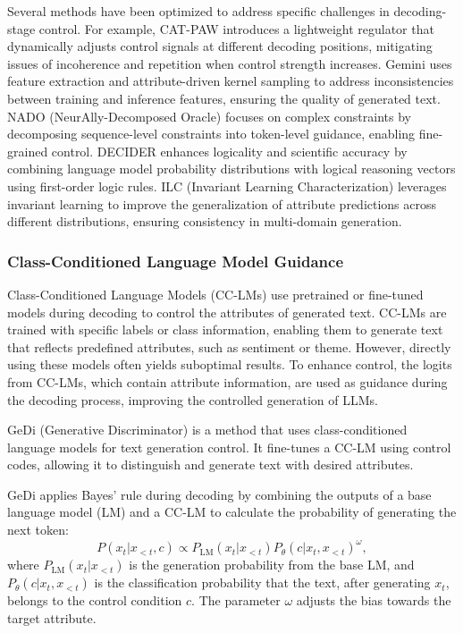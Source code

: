 \documentclass[acmsmall, screen]{acmart}
\begin{document}
Several methods have been optimized to address specific challenges in decoding-stage control. For example, CAT-PAW \cite{gu_acl22-CAT-PAW} introduces a lightweight regulator that dynamically adjusts control signals at different decoding positions, mitigating issues of incoherence and repetition when control strength increases.
Gemini \cite{liu_arxiv22_Gemini} uses feature extraction and attribute-driven kernel sampling to address inconsistencies between training and inference features, ensuring the quality of generated text.
NADO (NeurAlly-Decomposed Oracle) \cite{meng_NIPS22_NADO} focuses on complex constraints by decomposing sequence-level constraints into token-level guidance, enabling fine-grained control.
DECIDER \cite{xu_arxiv24_DECIDER} enhances logicality and scientific accuracy by combining language model probability distributions with logical reasoning vectors using first-order logic rules.
ILC (Invariant Learning Characterization) \cite{zheng_acl23_ILC} leverages invariant learning to improve the generalization of attribute predictions across different distributions, ensuring consistency in multi-domain generation.

\subsubsection{\textbf{Class-Conditioned Language Model Guidance}} 
Class-Conditioned Language Models (CC-LMs) use pretrained or fine-tuned models during decoding to control the attributes of generated text. CC-LMs are trained with specific labels or class information, enabling them to generate text that reflects predefined attributes, such as sentiment or theme. However, directly using these models often yields suboptimal results. To enhance control, the logits from CC-LMs, which contain attribute information, are used as guidance during the decoding process, improving the controlled generation of LLMs.

GeDi (Generative Discriminator) \cite{krause_emnlp21_gedi} is a method that uses class-conditioned language models for text generation control. It fine-tunes a CC-LM using control codes, allowing it to distinguish and generate text with desired attributes.

GeDi applies Bayes' rule during decoding by combining the outputs of a base language model (LM) and a CC-LM to calculate the probability of generating the next token:
\begin{equation}
P(x_t|x_{<t}, c) \propto P_{\text{LM}}(x_t|x_{<t}) P_\theta(c|x_t, x_{<t})^\omega,
\end{equation}
where \(P_{\text{LM}}(x_t|x_{<t})\) is the generation probability from the base LM, and \(P_\theta(c|x_t, x_{<t})\) is the classification probability that the text, after generating \(x_t\), belongs to the control condition \(c\). The parameter \(\omega\) adjusts the bias towards the target attribute.
\end{document}
